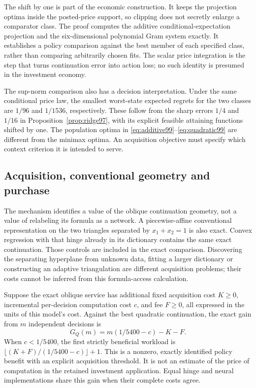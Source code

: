 The shift by one is part of the economic construction. It keeps the projection optima inside the posted-price support, so clipping does not secretly enlarge a comparator class. The proof computes the additive conditional-expectation projection and the six-dimensional polynomial Gram system exactly. It establishes a policy comparison against the best member of each specified class, rather than comparing arbitrarily chosen fits. The scalar price integration is the step that turns continuation error into action loss; no such identity is presumed in the investment economy.

The sup-norm comparison also has a decision interpretation. Under the same conditional price law, the smallest worst-state expected regrets for the two classes are $1/96$ and $1/1536$, respectively. These follow from the sharp errors $1/4$ and $1/16$ in Proposition~\ref{prop:ridge97}, with its explicit feasible attaining functions shifted by one. The population optima in \eqref{eq:additive99}--\eqref{eq:quadratic99} are different from the minimax optima. An acquisition objective must specify which context criterion it is intended to serve.

\subsection{Acquisition, conventional geometry and purchase}
The mechanism identifies a value of the oblique continuation geometry, not a value of relabeling its formula as a network. A piecewise-affine conventional representation on the two triangles separated by $x_1+x_2=1$ is also exact. Convex regression with that hinge already in its dictionary contains the same exact continuation. Those controls are included in the exact comparison. Discovering the separating hyperplane from unknown data, fitting a larger dictionary or constructing an adaptive triangulation are different acquisition problems; their costs cannot be inferred from this formula-access calculation.

Suppose the exact oblique service has additional fixed acquisition cost $K\ge0$, incremental per-decision computation cost $c$, and fee $F\ge0$, all expressed in the units of this model's cost. Against the best quadratic continuation, the exact gain from $m$ independent decisions is
\begin{equation}\label{eq:exactpurchase99}
 G_Q(m)=m(1/5400-c)-K-F.
\end{equation}
When $c<1/5400$, the first strictly beneficial workload is
$\lfloor(K+F)/(1/5400-c)\rfloor+1$. This is a nonzero, exactly identified policy benefit with an explicit acquisition threshold. It is not an estimate of the price of computation in the retained investment application. Equal hinge and neural implementations share this gain when their complete costs agree.

